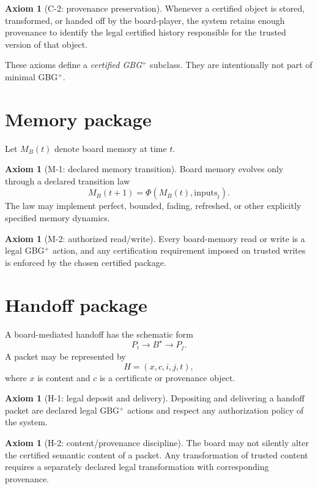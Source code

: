 \documentclass[11pt]{article}
\theoremstyle{definition}
\newtheorem{axiom}[theorem]{Axiom}
\theoremstyle{remark}
\newcommand{\Board}{B^{\star}}
\begin{document}
\begin{axiom}[C-2: provenance preservation]
Whenever a certified object is stored, transformed, or handed off by the board-player, the system retains enough provenance to identify the legal certified history responsible for the trusted version of that object.
\end{axiom}

These axioms define a \emph{certified GBG$^{+}$} subclass.  They are intentionally not part of minimal GBG$^{+}$.

\section{Memory package}

Let $M_B(t)$ denote board memory at time $t$.

\begin{axiom}[M-1: declared memory transition]
Board memory evolves only through a declared transition law
\[
M_B(t+1)=\Phi(M_B(t),\mathrm{inputs}_t).
\]
The law may implement perfect, bounded, fading, refreshed, or other explicitly specified memory dynamics.
\end{axiom}

\begin{axiom}[M-2: authorized read/write]
Every board-memory read or write is a legal GBG$^{+}$ action, and any certification requirement imposed on trusted writes is enforced by the chosen certified package.
\end{axiom}

\section{Handoff package}

A board-mediated handoff has the schematic form
\[
P_i\longrightarrow\Board\longrightarrow P_j.
\]
A packet may be represented by
\[
H=(x,c,i,j,t),
\]
where $x$ is content and $c$ is a certificate or provenance object.

\begin{axiom}[H-1: legal deposit and delivery]
Depositing and delivering a handoff packet are declared legal GBG$^{+}$ actions and respect any authorization policy of the system.
\end{axiom}

\begin{axiom}[H-2: content/provenance discipline]
The board may not silently alter the certified semantic content of a packet.  Any transformation of trusted content requires a separately declared legal transformation with corresponding provenance.
\end{axiom}
\end{document}
